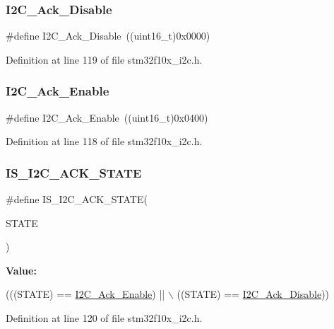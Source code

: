 \subsubsection{\texorpdfstring{I2\+C\+\_\+\+Ack\+\_\+\+Disable}{I2C\_Ack\_Disable}}
{\footnotesize\ttfamily \#define I2\+C\+\_\+\+Ack\+\_\+\+Disable~((uint16\+\_\+t)0x0000)}



Definition at line 119 of file stm32f10x\+\_\+i2c.\+h.

\mbox{\label{group___i2_c__acknowledgement_ga616466f8ef5a47237cdbf7ac578ec507}} 
\subsubsection{\texorpdfstring{I2\+C\+\_\+\+Ack\+\_\+\+Enable}{I2C\_Ack\_Enable}}
{\footnotesize\ttfamily \#define I2\+C\+\_\+\+Ack\+\_\+\+Enable~((uint16\+\_\+t)0x0400)}



Definition at line 118 of file stm32f10x\+\_\+i2c.\+h.

\mbox{\label{group___i2_c__acknowledgement_ga6401bedc842e784a2bb78b3aa21af19d}} 
\subsubsection{\texorpdfstring{I\+S\+\_\+\+I2\+C\+\_\+\+A\+C\+K\+\_\+\+S\+T\+A\+TE}{IS\_I2C\_ACK\_STATE}}
{\footnotesize\ttfamily \#define I\+S\+\_\+\+I2\+C\+\_\+\+A\+C\+K\+\_\+\+S\+T\+A\+TE(\begin{DoxyParamCaption}\item[{}]{S\+T\+A\+TE }\end{DoxyParamCaption})}

{\bfseries Value\+:}
\begin{DoxyCode}
(((STATE) == \hyperlink{group___i2_c__acknowledgement_ga616466f8ef5a47237cdbf7ac578ec507}{I2C\_Ack\_Enable}) || \(\backslash\)
                                 ((STATE) == \hyperlink{group___i2_c__acknowledgement_gadb5f47c052ac6bae1aa58c724e339e36}{I2C\_Ack\_Disable}))
\end{DoxyCode}


Definition at line 120 of file stm32f10x\+\_\+i2c.\+h.

